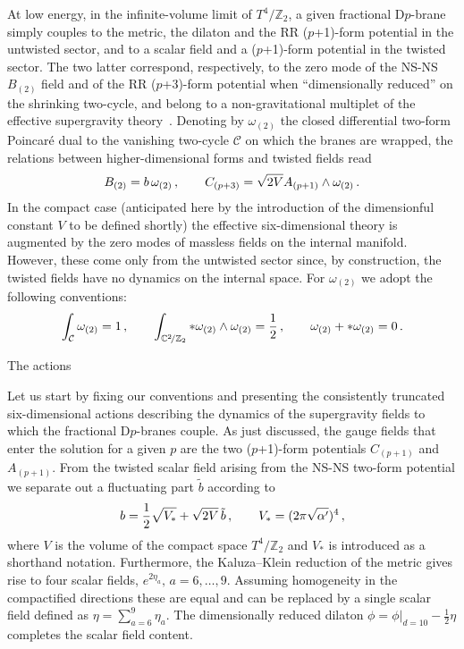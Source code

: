 \documentclass[a4paper,11pt]{article}
\makeatletter
\renewcommand{\subsection}{\@startsection{subsection}{2}{\z@} {-3.25ex
plus -1ex minus -.2ex}{1.5ex plus .2ex}{\normalsize\bf}}
\newcommand{\ZZ}{\mathbb{Z}}  \newcommand{\Zint}{\mathbb{Z}}
\makeatother
\begin{document}
At low energy, in the infinite-volume limit of $T^4\!/\ZZ_2$, a given
fractional D$p$-brane simply couples to the metric, the dilaton and
the RR ($p$+1)-form potential in the untwisted sector, and to a scalar
field and a ($p$+1)-form potential in the twisted sector. The two latter
correspond, respectively, to the zero mode of the NS-NS $B_{(2)}$ field
and of the RR ($p$+3)-form potential when ``dimensionally reduced'' on
the shrinking two-cycle, and belong to a non-gravitational multiplet of
the effective supergravity theory~\cite{Diaconescu:1998br,Billo:2000yb}.
Denoting by $\omega_{(2)}$ the closed differential two-form Poincar\'e
dual to the vanishing two-cycle $\mathcal{C}$ on which the branes are
wrapped, the relations between higher-dimensional forms and twisted
fields read
\begin{equation}
\label{twistedfields}
B_{(2)} = b \, \omega_{(2)} \,,\qquad C_{(p+3)}= \sqrt{2V} A_{(p+1)} \wedge
\omega_{(2)} \,.
\end{equation}
In the compact case (anticipated here by the introduction of the
dimensionful constant $V$ to be defined shortly) the effective
six-dimensional theory is augmented by the zero modes of massless
fields on the internal manifold. However, these come only from the
untwisted sector since, by construction, the twisted fields have no
dynamics on the internal space. For $\omega_{(2)}$ we adopt the
following conventions:
\begin{equation}
\label{omegaconv}
\int_{\mathcal{C}} \omega_{(2)} = 1 \spa \int_{\IC^2\!/\ZZ_2}
{*}\omega_{(2)}\wedge\omega_{(2)} = \frac{1}{2} \spa
\omega_{(2)}+{*}\omega_{(2)} = 0 \,.
\end{equation}


\subsection{The actions}
\label{subsect:lagrangian}

Let us start by fixing our conventions and presenting the consistently
truncated six-dimensional actions describing the dynamics of the
supergravity fields to which the fractional D$p$-branes couple. As
just discussed, the gauge fields that enter the solution for a given
$p$ are the two ($p$+1)-form potentials $C_{(p+1)}$ and $A_{(p+1)}$.
{}From the twisted scalar field arising from the NS-NS two-form
potential we separate out a fluctuating part $\tilde b$ according to
\begin{equation}
\label{Vsdef}
b = \frac{1}{2}\sqrt{V_*} + \sqrt{2V}\,\tilde b \,,\qquad
V_*=(2\pi\sqrt{\alpha'})^4 \,,
\end{equation}
where $V$ is the volume of the compact space $T^4\!/\ZZ_2$ and $V_*$
is introduced as a shorthand notation. Furthermore, the Kaluza--Klein
reduction of the metric gives rise to four scalar fields,
$e^{2\eta_a},\,a=6,\ldots,9$. Assuming homogeneity in the compactified
directions these are equal and can be replaced by a single scalar field
defined as $\eta = \sum_{a=6}^9 \eta_a$. The dimensionally reduced
dilaton $\phi=\phi|_{d=10}-\frac{1}{2}\eta$ completes the scalar field
content.
\end{document}
